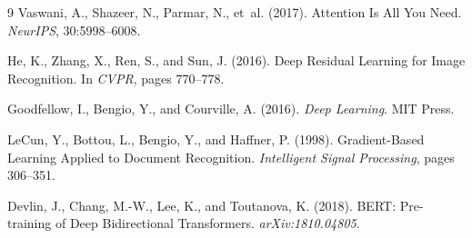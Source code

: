 \documentclass[12pt,a4paper,oneside]{book}
\theoremstyle{plain}
\theoremstyle{definition}
\theoremstyle{remark}
\begin{document}
\begin{thebibliography}{9}
Vaswani, A., Shazeer, N., Parmar, N., et~al. (2017).
\newblock Attention Is All You Need.
\newblock \emph{NeurIPS}, 30:5998--6008.

He, K., Zhang, X., Ren, S., and Sun, J. (2016).
\newblock Deep Residual Learning for Image Recognition.
\newblock In \emph{CVPR}, pages 770--778.

Goodfellow, I., Bengio, Y., and Courville, A. (2016).
\newblock \emph{Deep Learning}. MIT Press.

LeCun, Y., Bottou, L., Bengio, Y., and Haffner, P. (1998).
\newblock Gradient-Based Learning Applied to Document Recognition.
\newblock \emph{Intelligent Signal Processing}, pages 306--351.

Devlin, J., Chang, M.-W., Lee, K., and Toutanova, K. (2018).
\newblock BERT: Pre-training of Deep Bidirectional Transformers.
\newblock \emph{arXiv:1810.04805}.
\end{thebibliography}
\end{document}
